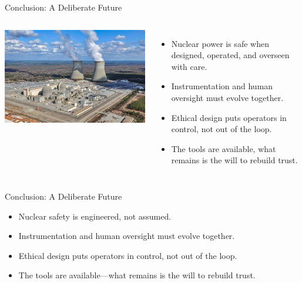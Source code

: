 \documentclass{beamer}
\begin{document}
\begin{frame}{Conclusion: A Deliberate Future}
  \begin{columns}
    \includegraphics[width=\textwidth]{vogtle}

    \begin{itemize}
      \item Nuclear power is safe when designed, operated, and overseen with care.
      \item Instrumentation and human oversight must evolve together.
      \item Ethical design puts operators in control, not out of the loop.
      \item The tools are available, what remains is the will to rebuild trust.
    \end{itemize}
  \end{columns}
\end{frame}

\begin{frame}{Conclusion: A Deliberate Future}
  \begin{itemize}
    \item Nuclear safety is engineered, not assumed.
    \item Instrumentation and human oversight must evolve together.
    \item Ethical design puts operators in control, not out of the loop.
    \item The tools are available—what remains is the will to rebuild trust.
  \end{itemize}
\end{frame}
\end{document}
